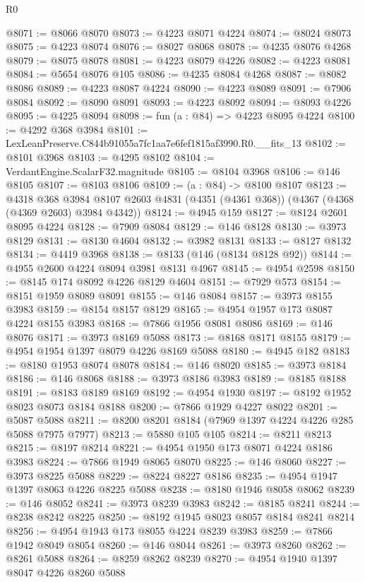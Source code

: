 \begin{lexlean}{R0}
\begin{coremodule}
@8071 := @8066 @8070
@8073 := @4223 @8071 @4224
@8074 := @8024 @8073
@8075 := @4223 @8074
@8076 := @8027 @8068
@8078 := @4235 @8076 @4268
@8079 := @8075 @8078
@8081 := @4223 @8079 @4226
@8082 := @4223 @8081
@8084 := @5654 @8076 @105
@8086 := @4235 @8084 @4268
@8087 := @8082 @8086
@8089 := @4223 @8087 @4224
@8090 := @4223 @8089
@8091 := @7906 @8084
@8092 := @8090 @8091
@8093 := @4223 @8092
@8094 := @8093 @4226
@8095 := @4225 @8094
@8098 := fun (a : @84) => @4223 @8095 @4224
@8100 := @4292 @368 @3984
@8101 := LexLeanPreserve.C844b91055a7fc1aa7e6fef1815af3990.R0.__fits_13
@8102 := @8101 @3968
@8103 := @4295 @8102
@8104 := VerdantEngine.ScalarF32.magnitude
@8105 := @8104 @3968
@8106 := @146 @8105
@8107 := @8103 @8106
@8109 := (a : @84) -> @8100 @8107
@8123 := @4318
    @368
    @3984
    @8107
    @2603
    @4831
    (@4351 (@4361 @368))
    (@4367 (@4368 (@4369 @2603) @3984 @4342))
@8124 := @4945 @159
@8127 := @8124 @2601 @8095 @4224
@8128 := @7909 @8084
@8129 := @146 @8128
@8130 := @3973 @8129
@8131 := @8130 @4604
@8132 := @3982 @8131
@8133 := @8127 @8132
@8134 := @4419 @3968
@8138 := @8133 (@146 (@8134 @8128 @92))
@8144 := @4955 @2600 @4224 @8094 @3981 @8131 @4967
@8145 := @4954 @2598
@8150 := @8145 @174 @8092 @4226 @8129 @4604
@8151 := @7929 @573
@8154 := @8151 @1959 @8089 @8091
@8155 := @146 @8084
@8157 := @3973 @8155 @3983
@8159 := @8154 @8157 @8129
@8165 := @4954 @1957 @173 @8087 @4224 @8155 @3983
@8168 := @7866 @1956 @8081 @8086
@8169 := @146 @8076
@8171 := @3973 @8169 @5088
@8173 := @8168 @8171 @8155
@8179 := @4954 @1954 @1397 @8079 @4226 @8169 @5088
@8180 := @4945 @182
@8183 := @8180 @1953 @8074 @8078
@8184 := @146 @8020
@8185 := @3973 @8184
@8186 := @146 @8068
@8188 := @3973 @8186 @3983
@8189 := @8185 @8188
@8191 := @8183 @8189 @8169
@8192 := @4954 @1930
@8197 := @8192 @1952 @8023 @8073 @8184 @8188
@8200 := @7866 @1929 @4227 @8022
@8201 := @5087 @5088
@8211 := @8200 @8201 @8184 (@7969 @1397 @4224 @4226 @285 @5088 @7975 @7977)
@8213 := @5880 @105 @105
@8214 := @8211 @8213
@8215 := @8197 @8214
@8221 := @4954 @1950 @173 @8071 @4224 @8186 @3983
@8224 := @7866 @1949 @8065 @8070
@8225 := @146 @8060
@8227 := @3973 @8225 @5088
@8229 := @8224 @8227 @8186
@8235 := @4954 @1947 @1397 @8063 @4226 @8225 @5088
@8238 := @8180 @1946 @8058 @8062
@8239 := @146 @8052
@8241 := @3973 @8239 @3983
@8242 := @8185 @8241
@8244 := @8238 @8242 @8225
@8250 := @8192 @1945 @8023 @8057 @8184 @8241 @8214
@8256 := @4954 @1943 @173 @8055 @4224 @8239 @3983
@8259 := @7866 @1942 @8049 @8054
@8260 := @146 @8044
@8261 := @3973 @8260
@8262 := @8261 @5088
@8264 := @8259 @8262 @8239
@8270 := @4954 @1940 @1397 @8047 @4226 @8260 @5088

\end{coremodule}
\end{lexlean}
